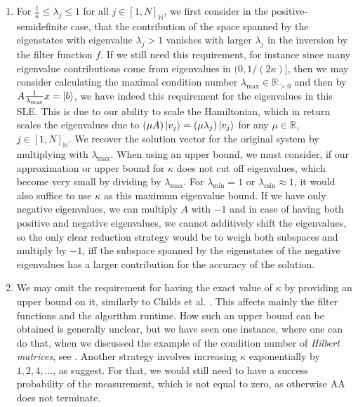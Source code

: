 \begin{enumerate}[label=\arabic*.]
    \item For \(\frac{1}{\kappa} \leq \lambda_j \leq 1\) for all \(j \in [1, N]_{\mathbb{N}}\), we first consider in the positive-semidefinite case, that the contribution of the space spanned by the eigenstates with eigenvalue \(\lambda_j > 1\) vanishes with larger \(\lambda_j\) in the inversion by the filter function \(f\). If we still need this requirement, for instance since many eigenvalue contributions come from eigenvalues in \((0, 1/(2\kappa)]\), then we may consider calculating the maximal condition number \(\lambda_{\max} \in \mathbb{R}_{> 0}\) and then by \(A\frac{1}{\lambda_{\max}}x = \ket{b}\), we have indeed this requirement for the eigenvalues in this SLE. This is due to our ability to scale the Hamiltonian, which in return scales the eigenvalues due to \((\mu A)\ket{v_j} = (\mu\lambda_j)\ket{v_j}\) for any \(\mu \in \mathbb{R}\), \(j \in [1, N]_{\mathbb{N}}\). We recover the solution vector for the original system by multiplying with \(\lambda_{\max}\). When using an upper bound, we must consider, if our approximation or upper bound for \(\kappa\) does not cut off eigenvalues, which become very small by dividing by \(\lambda_{\max}\). For \(\lambda_{\min} = 1\) or \(\lambda_{\min} \approx 1\), it would also suffice to use \(\kappa\) as this maximum eigenvalue bound. If we have only negative eigenvalues, we can multiply \(A\) with \(-1\) and in case of having both positive and negative eigenvalues, we cannot additively shift the eigenvalues, so the only clear reduction strategy would be to weigh both subspaces and multiply by \(-1\), iff the subspace spanned by the eigenstates of the negative eigenvalues has a larger contribution for the accuracy of the solution.
    \item We may omit the requirement for having the exact value of \(\kappa\) by providing an upper bound on it, similarly to Childs et al. \cite[p. 3]{Childs2015}. This affects mainly the filter functions and the algorithm runtime. How such an upper bound can be obtained is generally unclear, but we have seen one instance, where one can do that, when we discussed the example of the condition number of \emph{Hilbert matrices}, see . Another strategy involves increasing \(\kappa\) exponentially by \(1, 2, 4, ...\), as \cite[p. 6]{Harrow2008} suggest. For that, we would still need to have a success probability of the measurement, which is not equal to zero, as otherwise AA does not terminate.
\end{enumerate}

